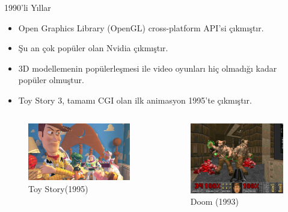 \documentclass{beamer}
\begin{document}
\begin{frame}{1990'li Yıllar}
\begin{itemize}
\item Open Graphics Library (OpenGL) cross-platform API'si çıkmıştır.
\item Şu an çok popüler olan Nvidia çıkmıştır.
\item 3D modellemenin popülerleşmesi ile video oyunları hiç olmadığı kadar popüler olmuştur.
\item Toy Story 3, tamamı CGI olan ilk animasyon 1995'te çıkmıştır.
\end{itemize}
\begin{columns}
\begin{column}{0.4\textwidth}
\begin{figure}
\includegraphics[width=\textwidth]{toystory.jpg}
\caption{Toy Story(1995)}
\end{figure}
\end{column}
\begin{column}{0.4\textwidth}
\begin{figure}
\includegraphics[width=\textwidth]{doom.jpg}
\caption{Doom (1993)}
\end{figure}
\end{column}
\end{columns}
\end{frame}
\end{document}
